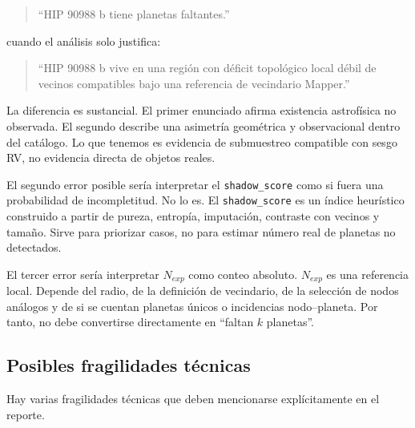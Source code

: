 \documentclass[11pt]{article}
\begin{document}
\begin{quote}
``HIP 90988 b tiene planetas faltantes.''
\end{quote}

cuando el análisis solo justifica:

\begin{quote}
``HIP 90988 b vive en una región con déficit topológico local débil de vecinos compatibles bajo una referencia de vecindario Mapper.''
\end{quote}

La diferencia es sustancial. El primer enunciado afirma existencia astrofísica no observada. El segundo describe una asimetría geométrica y observacional dentro del catálogo. Lo que tenemos es evidencia de submuestreo compatible con sesgo RV, no evidencia directa de objetos reales.

El segundo error posible sería interpretar el \texttt{shadow\_score} como si fuera una probabilidad de incompletitud. No lo es. El \texttt{shadow\_score} es un índice heurístico construido a partir de pureza, entropía, imputación, contraste con vecinos y tamaño. Sirve para priorizar casos, no para estimar número real de planetas no detectados.

El tercer error sería interpretar $N_{exp}$ como conteo absoluto. $N_{exp}$ es una referencia local. Depende del radio, de la definición de vecindario, de la selección de nodos análogos y de si se cuentan planetas únicos o incidencias nodo--planeta. Por tanto, no debe convertirse directamente en ``faltan $k$ planetas''.

\subsection{Posibles fragilidades técnicas}

Hay varias fragilidades técnicas que deben mencionarse explícitamente en el reporte.
\end{document}
